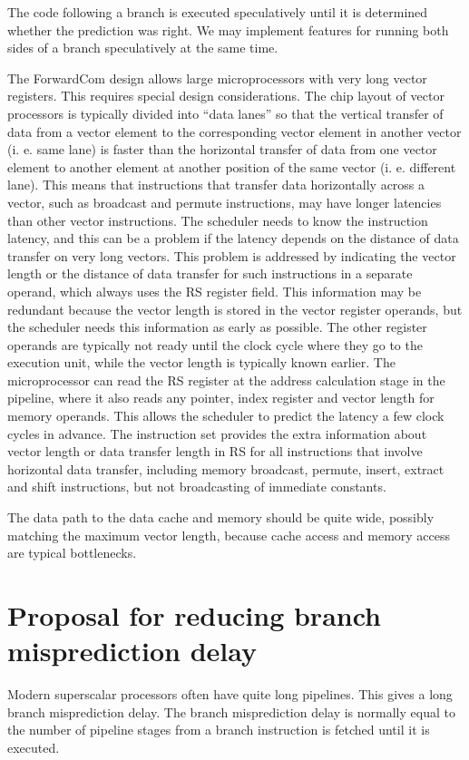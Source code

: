 \documentclass[forwardcom.tex]{subfiles}
\begin{document}
The code following a branch is executed speculatively until it is determined whether the prediction was right. We may implement features for running both sides of a branch speculatively at the same time. 
\vspace{2mm}

The ForwardCom design allows large microprocessors with very long vector registers. This requires special design considerations. The chip layout of vector processors is typically divided into ``data lanes'' so that the vertical transfer of data from a vector element to the corresponding 
vector element in another vector (i. e. same lane) is faster than the horizontal transfer of data from one vector element to another element at another position of the same vector (i. e. different lane). This means that instructions that transfer data horizontally across a vector, such as broadcast and permute instructions, may have longer latencies than other vector instructions. The scheduler needs to know the instruction latency, and this can be a problem if the latency depends on the distance of data transfer on very long vectors. This problem is addressed by indicating the vector length or the distance of data transfer for such instructions in a separate operand, which always uses the RS register field. This information may be redundant because the vector length is stored in the vector register operands, but the scheduler needs this information as early as possible. The other register operands are typically not ready until the clock cycle where they go to the execution unit, while the vector length is typically known earlier. The microprocessor can read the RS register at the address calculation stage in the pipeline, where it also reads any pointer, index register and vector length for memory operands. This allows the scheduler to predict the latency a few clock cycles in advance. The instruction set provides the extra information about vector length or data transfer length in RS for all instructions that involve horizontal data transfer, including memory broadcast, permute, insert, extract and shift instructions, but not broadcasting of immediate constants. 
\vspace{2mm}

The data path to the data cache and memory should be quite wide, possibly matching the maximum vector length, because cache access and memory access are typical bottlenecks.


\section{Proposal for reducing branch misprediction delay}
Modern superscalar processors often have quite long pipelines. This gives a long branch misprediction delay. The branch misprediction delay is normally equal to the number of pipeline stages from a branch instruction is fetched until it is executed.
\vspace{2mm}
\end{document}
